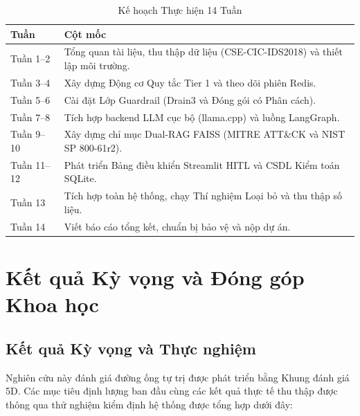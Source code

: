 \documentclass[12pt,a4paper]{article}
\begin{document}
\begin{table}[H]
    \centering
    \caption{Kế hoạch Thực hiện 14 Tuần}
    \label{tab:timeline}
    \begin{tabular}{lp{10cm}}
        \toprule
        \textbf{Tuần} & \textbf{Cột mốc} \\
        \midrule
        Tuần 1--2 & Tổng quan tài liệu, thu thập dữ liệu (CSE-CIC-IDS2018) và thiết lập môi trường. \\
        Tuần 3--4 & Xây dựng Động cơ Quy tắc Tier 1 và theo dõi phiên Redis. \\
        Tuần 5--6 & Cài đặt Lớp Guardrail (Drain3 và Đóng gói có Phân cách). \\
        Tuần 7--8 & Tích hợp backend LLM cục bộ (llama.cpp) và luồng LangGraph. \\
        Tuần 9--10 & Xây dựng chỉ mục Dual-RAG FAISS (MITRE ATT\&CK và NIST SP 800-61r2). \\
        Tuần 11--12 & Phát triển Bảng điều khiển Streamlit HITL và CSDL Kiểm toán SQLite. \\
        Tuần 13 & Tích hợp toàn hệ thống, chạy Thí nghiệm Loại bỏ và thu thập số liệu. \\
        Tuần 14 & Viết báo cáo tổng kết, chuẩn bị bảo vệ và nộp dự án. \\
        \bottomrule
    \end{tabular}
\end{table}

\newpage
\section{Kết quả Kỳ vọng và Đóng góp Khoa học}

\subsection{Kết quả Kỳ vọng và Thực nghiệm}
Nghiên cứu này đánh giá đường ống tự trị được phát triển bằng Khung đánh giá 5D. Các mục tiêu định lượng ban đầu cùng các kết quả thực tế thu thập được thông qua thử nghiệm kiểm định hệ thống được tổng hợp dưới đây:
\end{document}
